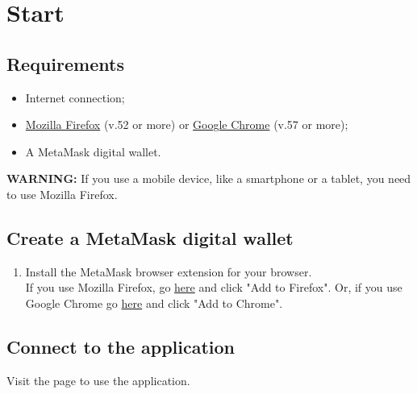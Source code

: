 \documentclass[ManualeUtente.tex]{subfiles}
\begin{document}
\chapter{Start}

\section{Requirements}
\begin{itemize}
	\item Internet connection;
	\item \href{https://www.mozilla.org/en-US/firefox/new/}{Mozilla Firefox} (v.52 or more) or	
	\href{https://www.google.com/intl/en/chrome/}{Google Chrome} (v.57 or more);
	\item A MetaMask digital wallet.
\end{itemize}

\textbf{WARNING: }If you use a mobile device, like a smartphone or a tablet, you need to use Mozilla Firefox.

\section{Create a MetaMask digital wallet}
\begin{enumerate}
	\item Install the MetaMask browser extension for your browser.\\
	If you use Mozilla Firefox, go
	\href{https://addons.mozilla.org/en-US/firefox/addon/ether-metamask/}{here}
	  and click "Add to Firefox". Or, if you use Google Chrome go \href{https://chrome.google.com/webstore/detail/metamask/nkbihfbeogaeaoehlefnkodbefgpgknn}{here} and click "Add to Chrome".

\end{enumerate}

\section{Connect to the application}
Visit the page  to use the application. %
\end{document}
